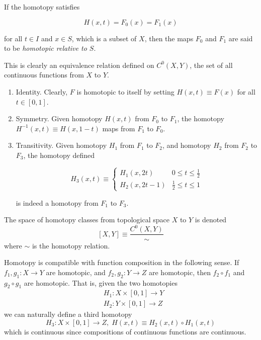   \begin{definition}
    If the homotopy satisfies 

      \[H(x,t) = F_0 (x) = F_1 (x)\]

    for all $t \in I$ and $x \in S$, which is a subset of $X$, then the maps $F_0$ and $F_1$ are said to be \textit{homotopic relative to $S$}. 
  \end{definition}

  This is clearly an equivalence relation defined on $C^0 (X, Y)$, the set of all continuous functions from $X$ to $Y$.
  \begin{enumerate}
    \item Identity. Clearly, $F$ is homotopic to itself by setting $H(x, t) \equiv F(x)$ for all $t \in [0,1]$. 

    \item Symmetry. Given homotopy $H(x, t)$ from $F_0$ to $F_1$, the homotopy $H^{-1} (x, t) \equiv H(x, 1-t)$ maps from $F_1$ to $F_0$. 

    \item Transitivity. Given homotopy $H_1$ from $F_1$ to $F_2$, and homotopy $H_2$ from $F_2$ to $F_3$, the homotopy defined

    \[H_3 (x, t) \equiv \begin{cases}
          H_1 (x, 2t) & 0 \leq t \leq \frac{1}{2} \\
          H_2 (x, 2t - 1) & \frac{1}{2} \leq t \leq 1
    \end{cases}\]

    is indeed a homotopy from $F_1$ to $F_3$. 
  \end{enumerate}

  \begin{definition}
  The space of homotopy classes from topological space $X$ to $Y$ is denoted
  \[[X, Y] \equiv \frac{C^0 (X, Y)}{\sim}\]
  where $\sim$ is the homotopy relation. 
  \end{definition}

  \begin{lemma}
  Homotopy is compatible with function composition in the following sense. If $f_1, g_1: X \longrightarrow Y$ are homotopic, and $f_2, g_2: Y \longrightarrow Z$ are homotopic, then $f_2 \circ f_1$ and $g_2 \circ g_1$ are homotopic. That is, given the two homotopies
  \begin{align*}
      & H_1: X \times [0,1] \longrightarrow Y \\
      & H_2: Y \times [0,1] \longrightarrow Z
  \end{align*}
  we can naturally define a third homotopy 
  \[H_3: X \times [0,1] \longrightarrow Z, \; H(x, t) \equiv H_2 (x, t) \circ H_1(x, t)\]
  which is continuous since compositions of continuous functions are continuous. 
  \end{lemma}

